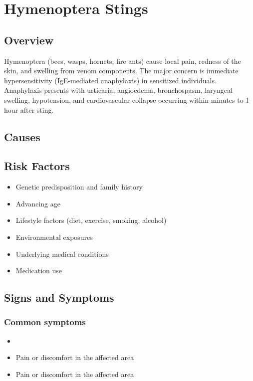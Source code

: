 \chapter{Hymenoptera Stings}
\label{sec:Hymenoptera Stings}

\section{Overview}
Hymenoptera (bees, wasps, hornets, fire ants) cause local pain, redness of the skin, and swelling from venom components. The major concern is immediate hypersensitivity (IgE-mediated anaphylaxis) in sensitized individuals. Anaphylaxis presents with urticaria, angioedema, bronchospasm, laryngeal swelling, hypotension, and cardiovascular collapse occurring within minutes to 1 hour after sting.
\section{Causes}
\section{Risk Factors}

\begin{itemize}[noitemsep]
  \item Genetic predisposition and family history
  \item Advancing age
  \item Lifestyle factors (diet, exercise, smoking, alcohol)
  \item Environmental exposures
  \item Underlying medical conditions
  \item Medication use
\end{itemize}
\section{Signs and Symptoms}

\subsection{Common symptoms}
\begin{itemize}[noitemsep]
  \item \item Pain or discomfort in the affected area    \item Pain or discomfort in the affected area
  \end{itemize}

